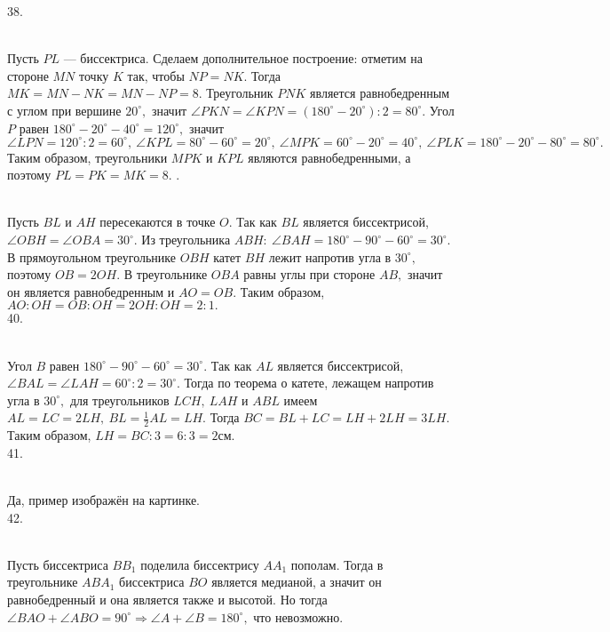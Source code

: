 38. \begin{figure}[ht!]
\end{figure}\\
Пусть $PL$ --- биссектриса. Сделаем дополнительное построение: отметим на стороне $MN$ точку $K$ так, чтобы $NP=NK.$ Тогда $MK=MN-NK=MN-NP=8.$ Треугольник $PNK$ является равнобедренным с углом при вершине $20^\circ,$ значит $\angle PKN=\angle KPN=(180^\circ-20^\circ):2=80^\circ.$ Угол $P$ равен $180^\circ-20^\circ-40^\circ=120^\circ,$ значит $\angle LPN=120^\circ:2=60^\circ,\ \angle KPL=80^\circ-60^\circ=20^\circ,\ \angle MPK=60^\circ-20^\circ=40^\circ,\ \angle PLK=180^\circ-20^\circ-80^\circ=80^\circ.$ Таким образом, треугольники $MPK$ и $KPL$ являются равнобедренными, а поэтому $PL=PK=MK=8.$\newpage
{}. \begin{figure}[ht!]
\end{figure}\\
Пусть $BL$ и $AH$ пересекаются в точке $O.$ Так как $BL$ является биссектрисой, $\angle OBH=\angle OBA=30^\circ.$ Из треугольника $ABH:\ \angle BAH=180^\circ-90^\circ-60^\circ=30^\circ.$ В прямоугольном треугольнике $OBH$ катет $BH$ лежит напротив угла в $30^\circ,$ поэтому $OB=2OH.$ В треугольнике $OBA$ равны углы при стороне $AB,$ значит он является равнобедренным и $AO=OB.$ Таким образом, $AO:OH=OB:OH=2OH:OH=2:1.$\\
40. \begin{figure}[ht!]
\end{figure}\\
Угол $B$ равен $180^\circ-90^\circ-60^\circ=30^\circ.$ Так как $AL$ является биссектрисой, $\angle BAL= \angle LAH=60^\circ:2=30^\circ.$ Тогда по теорема о катете, лежащем напротив угла в $30^\circ,$ для треугольников $LCH,\ LAH$ и $ABL$ имеем $AL=LC=2LH,\ BL=\frac{1}{2}AL=LH.$ Тогда $BC=BL+LC=LH+2LH=3LH.$ Таким образом, $LH=BC:3=6:3=2$см.\\
41. \begin{figure}[ht!]
\end{figure}\\
Да, пример изображён на картинке.\\
42. \begin{figure}[ht!]
\end{figure}\\
Пусть биссектриса $BB_1$ поделила биссектрису $AA_1$ пополам. Тогда в треугольнике $ABA_1$ биссектриса $BO$ является медианой, а значит он равнобедренный и она является также и высотой. Но тогда $\angle BAO+\angle ABO=90^\circ\Rightarrow \angle A+\angle B=180^\circ,$ что невозможно.\\
